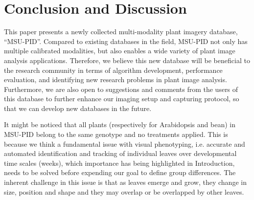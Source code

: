 \section{Conclusion and Discussion}

This paper presents a newly collected multi-modality plant imagery database, ``MSU-PID''.
Compared to existing databases in the field, MSU-PID not only has multiple calibrated modalities, but also enables a wide variety of plant image analysis applications.
Therefore, we believe this new database will be beneficial to the research community in terms of algorithm development, performance evaluation, and identifying new research problems in plant image analysis.
Furthermore, we are also open to suggestions and comments from the users of this database to further enhance our imaging setup and capturing protocol, so that we can develop new databases in the future.

It might be noticed that all plants (respectively for Arabidopsis and bean) in MSU-PID belong to the same genotype and no treatments applied. %
This is because we think a fundamental issue with visual phenotyping, i.e. accurate and automated identification and tracking of individual leaves over developmental time scales (weeks), which importance has being highlighted in Introduction, needs to be solved before expending our goal to define group differences. The inherent challenge in this issue is that as leaves emerge and grow, they change in size, position and shape and they may overlap or be overlapped by other leaves.  %



